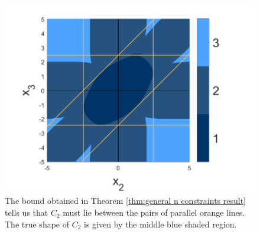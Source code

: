 		\begin{figure}
			\centering
			\includegraphics{Figures/Mixtures/normal_flag_graph_m2_bound.png}
			\caption{The bound obtained in Theorem \ref{thm:general n constraints result} tells us that $C_2$ must lie between the pairs of parallel orange lines. The true shape of $C_2$ is given by the middle blue shaded region.}
			\label{fig:flag graph m2 bound}
		\end{figure}



